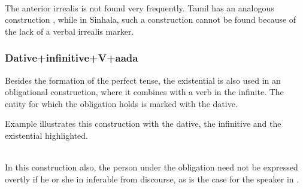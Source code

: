 

 \\


The anterior irrealis is not found very frequently. Tamil has an analogous construction \citep[207]{Lehmann1989}, while in Sinhala, such a construction cannot be found because of the lack of a verbal irrealis marker.


\subsubsection[\textsc{dat + inf + V} + aada]{Dative+infinitive+V+aada}\label{sec:wc:Dative+infinitive+V+aada}
Besides the formation of the perfect tense, the existential is also used in an obligational construction, where it combines with a verb in the infinite. The entity for which the obligation holds is marked with the dative.


Example  illustrates this construction with the dative, the infinitive and the existential highlighted.

 \\
In this construction also, the person under the obligation need not be expressed overtly if he or she in inferable from discourse, as is the case for the speaker in .

